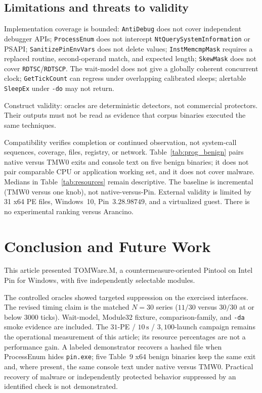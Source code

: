 \documentclass[pdflatex,sn-mathphys-num]{sn-jnl}
\theoremstyle{thmstyleone}
\theoremstyle{thmstyletwo}
\theoremstyle{thmstylethree}
\begin{document}
\subsection{Limitations and threats to validity}
\label{subsec:limitations}

Implementation coverage is bounded: \texttt{AntiDebug} does not cover independent debugger APIs; \texttt{ProcessEnum} does not intercept \texttt{NtQuerySystemInformation} or PSAPI; \texttt{SanitizePinEnvVars} does not delete values; \texttt{InstMemcmpMask} requires a replaced routine, second-operand match, and expected length; \texttt{SkewMask} does not cover \texttt{RDTSC}/\texttt{RDTSCP}. The wait-model does not give a globally coherent concurrent clock; \texttt{GetTickCount} can regress under overlapping calibrated sleeps; alertable \texttt{SleepEx} under \texttt{-do} may not return.

Construct validity: oracles are deterministic detectors, not commercial protectors. Their outputs must not be read as evidence that corpus binaries executed the same techniques.

Compatibility verifies completion or continued observation, not system-call sequences, coverage, files, registry, or network. Table~\ref{tab:prog_benign} pairs native versus TMW0 exits and console text on five benign binaries; it does not pair comparable CPU or application working set, and it does not cover malware. Medians in Table~\ref{tab:resources} remain descriptive. The baseline is incremental (TMW0 versus one knob), not native-versus-Pin. External validity is limited by 31 x64 PE files, Windows~10, Pin~$3.28.98749$, and a virtualized guest. There is no experimental ranking versus Arancino.

\section{Conclusion and Future Work}
\label{sec:conclusion}

This article presented TOMWare.M, a countermeasure-oriented Pintool on Intel Pin for Windows, with five independently selectable modules.

The controlled oracles showed targeted suppression on the exercised interfaces. The revised timing claim is the matched $N=30$ series ($11/30$ versus $30/30$ at or below $3000$ ticks). Wait-model, Module32 fixture, comparison-family, and \texttt{-da} smoke evidence are included. The $31$-PE / $10\,\mathrm{s}$ / $3{,}100$-launch campaign remains the operational measurement of this article; its resource percentages are not a performance gain. A labeled demonstrator recovers a hashed file when ProcessEnum hides \texttt{pin.exe}; five Table~9 x64 benign binaries keep the same exit and, where present, the same console text under native versus TMW0. Practical recovery of malware or independently protected behavior suppressed by an identified check is not demonstrated.
\end{document}
